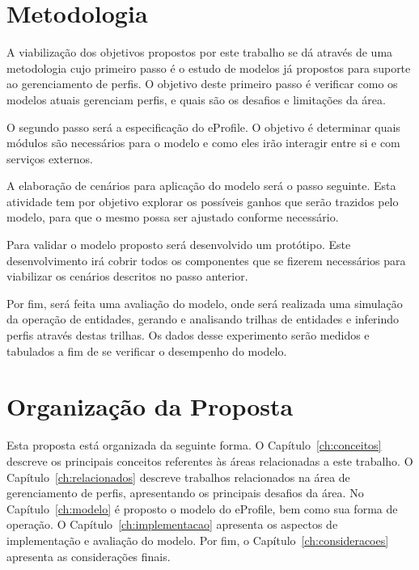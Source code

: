 
\section{Metodologia}
\label{sec:metodologia}

A viabilização dos objetivos propostos por este trabalho se dá através de uma metodologia cujo primeiro passo é o estudo de modelos já propostos para suporte ao gerenciamento de perfis. O objetivo deste primeiro passo é verificar como os modelos atuais gerenciam perfis, e quais são os desafios e limitações da área.

O segundo passo será a especificação do eProfile. O objetivo é determinar quais módulos são necessários para o modelo e como eles irão interagir entre si e com serviços externos.

A elaboração de cenários para aplicação do modelo será o passo seguinte. Esta atividade tem por objetivo explorar os possíveis ganhos que serão trazidos pelo modelo, para que o mesmo possa ser ajustado conforme necessário.

Para validar o modelo proposto será desenvolvido um protótipo. Este desenvolvimento irá cobrir todos os componentes que se fizerem necessários para viabilizar os cenários descritos no passo anterior.

Por fim, será feita uma avaliação do modelo, onde será realizada uma simulação da operação de entidades, gerando e analisando trilhas de entidades e inferindo perfis através destas trilhas. Os dados desse experimento serão medidos e tabulados a fim de se verificar o desempenho do modelo.


\section{Organização da Proposta}
\label{sec:organizacao}

Esta proposta está organizada da seguinte forma. O Capítulo~\ref{ch:conceitos} descreve os principais conceitos referentes às áreas relacionadas a este trabalho. O Capítulo~\ref{ch:relacionados} descreve trabalhos relacionados na área de gerenciamento de perfis, apresentando os principais desafios da área. No Capítulo~\ref{ch:modelo} é proposto o modelo do eProfile, bem como sua forma de operação. O Capítulo~\ref{ch:implementacao} apresenta os aspectos de implementação e avaliação do modelo. Por fim, o Capítulo~\ref{ch:consideracoes} apresenta as considerações finais.
